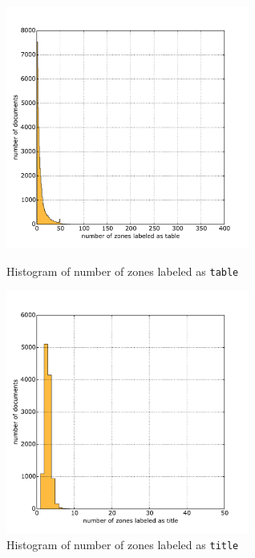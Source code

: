   \begin{figure}
\centering
\begin{minipage}[t!]{0.48\linewidth}
  \includegraphics[width=8cm]{plots/table_histogram}
  \caption{Histogram of number of zones labeled as \texttt{table}}
  \label{fig:table_histogram}
\end{minipage}
\quad
\begin{minipage}[t!]{0.48\linewidth}
  \includegraphics[width=8cm]{plots/title_histogram}
  \caption{Histogram of number of zones labeled as \texttt{title}}
  \label{fig:title_histogram}
\end{minipage}
\end{figure}


